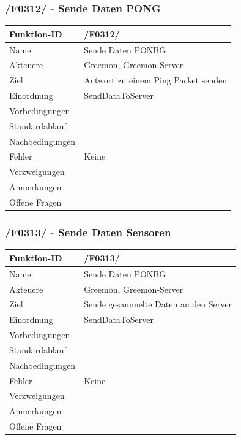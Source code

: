 \documentclass[pointlessnumbers]{scrartcl}
\begin{document}
 \subsubsection{/F0312/ - Sende Daten PONG}
 \begin{tabular}{|p{\BreiteErsterTab}|p{\BreiteZweiterTab}|}\hline
   Funktion-ID & /F0312/  \\ \hline
   Name & Sende Daten PONBG\\ \hline
   Akteuere & Greemon, Greemon-Server\\ \hline
   Ziel & Antwort zu einem Ping Packet senden \\ \hline
    Einordnung & SendDataToServer \\ \hline
    Vorbedingungen &  \\ \hline
    Standardablauf & \\ \hline
    Nachbedingungen &  \\ \hline
    Fehler & Keine \\ \hline
    Verzweigungen &  \\ \hline
    Anmerkungen &  \\ \hline
    Offene Fragen & \\ \hline
 \end{tabular} 

 \subsubsection{/F0313/ - Sende Daten Sensoren}
 \begin{tabular}{|p{\BreiteErsterTab}|p{\BreiteZweiterTab}|}\hline
   Funktion-ID & /F0313/  \\ \hline
   Name & Sende Daten PONBG\\ \hline
   Akteuere & Greemon, Greemon-Server\\ \hline
   Ziel & Sende gesammelte Daten an den Server \\ \hline
    Einordnung & SendDataToServer \\ \hline
    Vorbedingungen &  \\ \hline
    Standardablauf & \\ \hline
    Nachbedingungen &  \\ \hline
    Fehler & Keine \\ \hline
    Verzweigungen &  \\ \hline
    Anmerkungen &  \\ \hline
    Offene Fragen & \\ \hline
 \end{tabular} 
\end{document}
